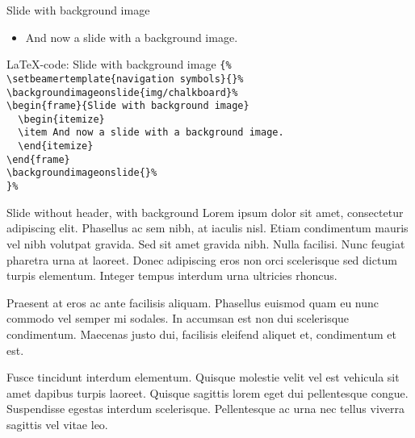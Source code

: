 \begin{frame}{Slide with background image}
\begin{itemize}
\item And now a slide with a background image.
\end{itemize}
\end{frame}
\backgroundimageonslide{}

\toggleslidecolors
\begin{frame}[fragile]{\LaTeX-code: Slide with background image}
\footnotesize
\verb|{%|\\
\verb|\setbeamertemplate{navigation symbols}{}%|\\
\verb|\backgroundimageonslide{img/chalkboard}%|\\
\verb|\begin{frame}{Slide with background image}|\\
\verb|  \begin{itemize}|\\
\verb|  \item And now a slide with a background image.|\\
\verb|  \end{itemize}|\\
\verb|\end{frame}|\\
\verb|\backgroundimageonslide{}%|\\
\verb|}%|\\
\end{frame}
\toggleslidecolors

{
\begin{frame}[plain]{Slide without header, with background}
Lorem ipsum dolor sit amet, consectetur adipiscing elit. Phasellus ac sem nibh, at iaculis nisl. Etiam condimentum mauris vel nibh volutpat gravida. Sed sit amet gravida nibh. Nulla facilisi. Nunc feugiat pharetra urna at laoreet. Donec adipiscing eros non orci scelerisque sed dictum turpis elementum. Integer tempus interdum urna ultricies rhoncus.
\vspace{\baselineskip}

Praesent at eros ac ante facilisis aliquam. Phasellus euismod quam eu nunc commodo vel semper mi sodales. In accumsan est non dui scelerisque condimentum. Maecenas justo dui, facilisis eleifend aliquet et, condimentum et est.
\vspace{\baselineskip}

Fusce tincidunt interdum elementum. Quisque molestie velit vel est vehicula sit amet dapibus turpis laoreet. Quisque sagittis lorem eget dui pellentesque congue. Suspendisse egestas interdum scelerisque. Pellentesque ac urna nec tellus viverra sagittis vel vitae leo.
\end{frame}
\backgroundimageonslide{}
}

